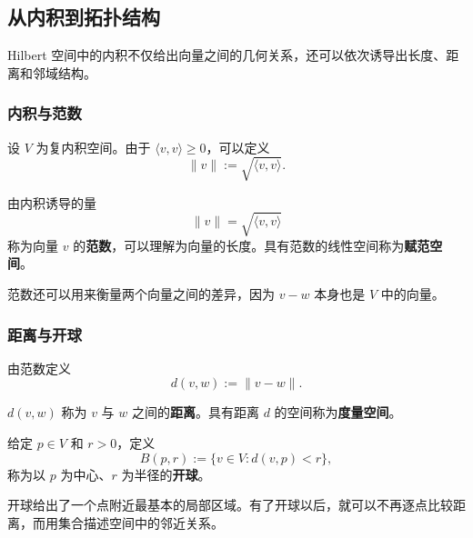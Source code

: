 \documentclass[UTF8,a4paper,11pt,openany]{ctexbook}
\begin{document}
\subsection{从内积到拓扑结构}

Hilbert 空间中的内积不仅给出向量之间的几何关系，还可以依次诱导出长度、距离和邻域结构。

\subsubsection{内积与范数}

设 $V$ 为复内积空间。由于 $\langle v,v\rangle\geq 0$，可以定义
\begin{equation}
    \|v\|
    :=
    \sqrt{\langle v,v\rangle}.
\end{equation}

\begin{definition}[范数]
由内积诱导的量
\[
\|v\|=\sqrt{\langle v,v\rangle}
\]
称为向量 $v$ 的\textbf{范数}，可以理解为向量的长度。具有范数的线性空间称为\textbf{赋范空间}。
\end{definition}

范数还可以用来衡量两个向量之间的差异，因为 $v-w$ 本身也是 $V$ 中的向量。

\subsubsection{距离与开球}

由范数定义
\begin{equation}
    d(v,w):=\|v-w\|.
\end{equation}

\begin{definition}[距离与开球]
$d(v,w)$ 称为 $v$ 与 $w$ 之间的\textbf{距离}。具有距离 $d$ 的空间称为\textbf{度量空间}。

给定 $p\in V$ 和 $r>0$，定义
\begin{equation}
    B(p,r)
    :=
    \{v\in V:d(v,p)<r\},
\end{equation}
称为以 $p$ 为中心、$r$ 为半径的\textbf{开球}。
\end{definition}

开球给出了一个点附近最基本的局部区域。有了开球以后，就可以不再逐点比较距离，而用集合描述空间中的邻近关系。

\end{document}
